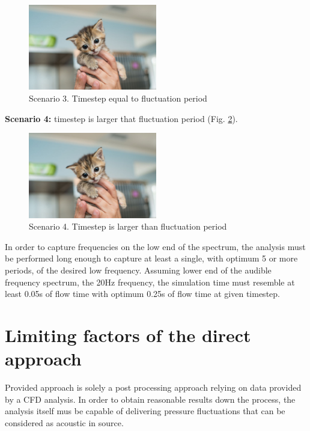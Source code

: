 \begin{figure}[h!]
\centering %
\includegraphics[width=0.5\textwidth]{Pictures/kitten-placeholder.jpg}
\caption{Scenario 3. Timestep equal to fluctuation period}
\label{time3}
\end{figure}

\textbf{Scenario 4:} timestep is larger that fluctuation period (Fig. \ref{time4}).

\begin{figure}[h!]
\centering %
\includegraphics[width=0.5\textwidth]{Pictures/kitten-placeholder.jpg}
\caption{Scenario 4. Timestep is larger than fluctuation period}
\label{time4}
\end{figure}

In order to capture frequencies on the low end of the spectrum, the analysis must be performed long enough to capture at least a single, with optimum 5 or more periods, of the desired low frequency. Assuming lower end of the audible frequency spectrum, the 20Hz frequency, the simulation time must resemble at least 0.05s of flow time with optimum 0.25s of flow time at given timestep.


\section{Limiting factors of the direct approach} \label{limits}
Provided approach is solely a post processing approach relying on data provided by a CFD analysis. In order to obtain reasonable results down the process, the analysis itself mus be capable of delivering pressure fluctuations that can be considered as acoustic in source. 

